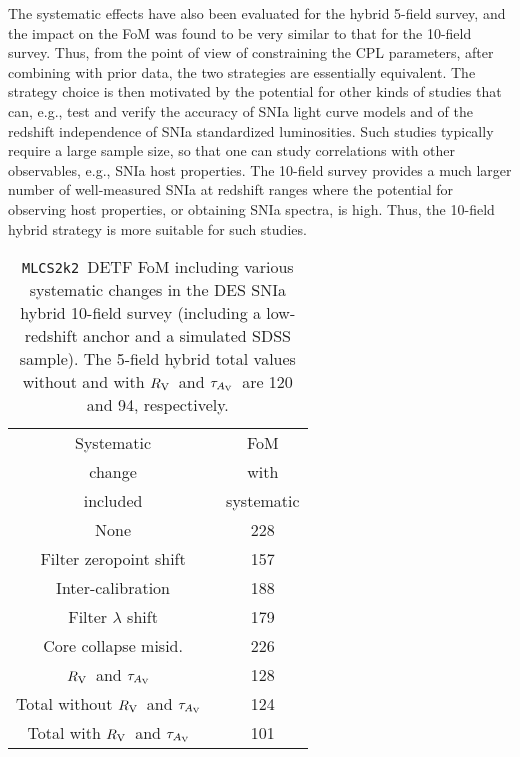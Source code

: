 \documentclass[preprint2]{aastex}    %
\newcommand\rv{$R_{\rm V}$}
\newcommand\tauav{$\tau_{A_{\rm V}}$}
\newcommand{\mlcs}{{\tt MLCS2k2}}
\begin{document}
The systematic effects have also been evaluated for the hybrid 5-field survey, 
and the impact on the FoM was found to be very similar to that for the 10-field survey. 
Thus, from the point of view of constraining the CPL parameters, after combining with prior 
data, the two strategies are essentially equivalent. The strategy choice is then 
motivated by the potential for other kinds of studies that can, e.g., test and 
verify the accuracy of SNIa light curve models and of the redshift
independence of SNIa standardized luminosities. Such studies typically require 
a large sample size, so that one can study correlations with other observables, 
e.g., SNIa host properties. The 10-field survey provides a much larger number 
of well-measured SNIa at redshift ranges where the potential for observing 
host properties, or obtaining SNIa spectra, is high. Thus, the 10-field 
hybrid strategy is more suitable for such studies.
%

\begin{table}[h]
\centering%
\begin{tabular}
[c]{|c|c|}\hline
Systematic & FoM \\
change & with\\
included & systematic\\
\hline
None & 228 \\
Filter zeropoint shift & 157 \\
Inter-calibration & 188\\
Filter $\lambda$ shift & 179 \\
Core collapse misid. & 226 \\
\rv\ and \tauav\  & 128 \\
\hline
Total without \rv\ and \tauav\ & 124 \\
\hline
Total with \rv\ and \tauav\ & 101\\
\hline
\end{tabular}
\caption{\mlcs\ DETF FoM including various systematic changes in the
DES SNIa hybrid 10-field survey (including a low-redshift anchor and a simulated 
SDSS sample). The 5-field hybrid total values without and with \rv\ and \tauav\ 
are 120 and 94, respectively.
}
\label{tab:fomsys}%
\end{table}
\end{document}
